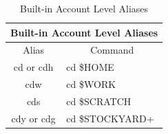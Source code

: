 \documentclass{article}
\begin{document}
\begin{table}[]
\centering
\caption{Built-in Account Level Aliases}
\label{my-label}
\begin{tabular}{|c|l|}\hline
\multicolumn{2}{|c|}{Built-in Account Level Aliases} \\ \hline\hline
\multicolumn{1}{|c|}{Alias} &\multicolumn{1}{|c|}{Command}      \\\hline\hline
cd or cdh  & cd \$HOME  \\\hline
cdw	   & cd \$WORK     \\\hline
cds	   & cd \$SCRATCH  \\\hline
cdy or cdg & cd \$STOCKYARD+\\\hline        
\end{tabular}
\end{table}
\end{document}
